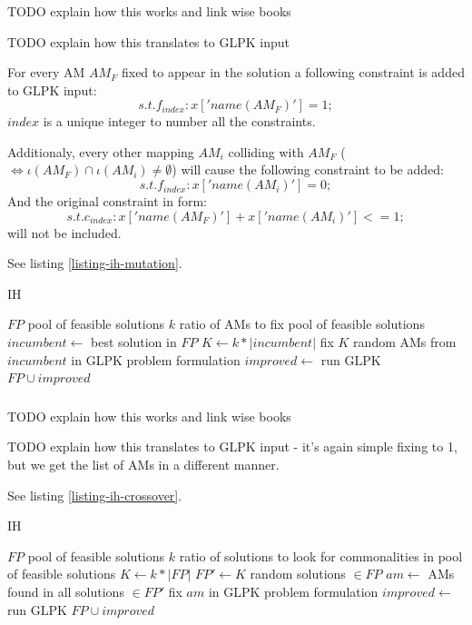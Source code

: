 \subsubsection{}

TODO explain how this works and link wise books

TODO explain how this translates to GLPK input

For every AM $AM_F$ fixed to appear in the solution a following constraint is added to GLPK input:
\[s.t. f_{index}: x['name(AM_F)'] = 1;\]
$index$ is a unique integer to number all the constraints.

Additionaly, every other mapping $AM_i$ colliding with $AM_F$ ($\iff \iota(AM_F) \cap \iota(AM_i) \neq \emptyset$) will cause the following constraint to be added:
\[s.t. f_{index}: x['name(AM_i)'] = 0;\]
And the original constraint in form:
\[s.t. c_{index}: x['name(AM_F)'] + x['name(AM_i)'] <= 1;\]
will not be included.

See listing \ref{listing-ih-mutation}.

\begin{algorithm}
\caption{ IH}
\label{listing-ih-mutation}
\begin{algorithmic}
\REQUIRE $FP$ pool of feasible solutions
\REQUIRE $k$ ratio of AMs to fix
\ENSURE pool of feasible solutions
\STATE $incumbent \gets $ best solution in $FP$ 
\STATE $K \gets k * |incumbent|$
\STATE fix $K$ random AMs from $incumbent$ in GLPK problem formulation
\STATE $improved \gets $ run GLPK
\RETURN $FP \cup improved$
\end{algorithmic}
\end{algorithm}

\subsubsection{}

TODO explain how this works and link wise books

TODO explain how this translates to GLPK input - it's again simple fixing to 1, but we get the list of AMs in a different manner.

See listing \ref{listing-ih-crossover}.

\begin{algorithm}
\caption{ IH}
\label{listing-ih-crossover}
\begin{algorithmic}
\REQUIRE $FP$ pool of feasible solutions
\REQUIRE $k$ ratio of solutions to look for commonalities in
\ENSURE pool of feasible solutions
\STATE $K \gets k * |FP|$
\STATE $FP' \gets K$ random solutions $\in FP$
\STATE $am \gets$ AMs found in all solutions $\in FP'$
\STATE fix $am$ in GLPK problem formulation
\STATE $improved \gets $ run GLPK
\RETURN $FP \cup improved$
\end{algorithmic}
\end{algorithm}

